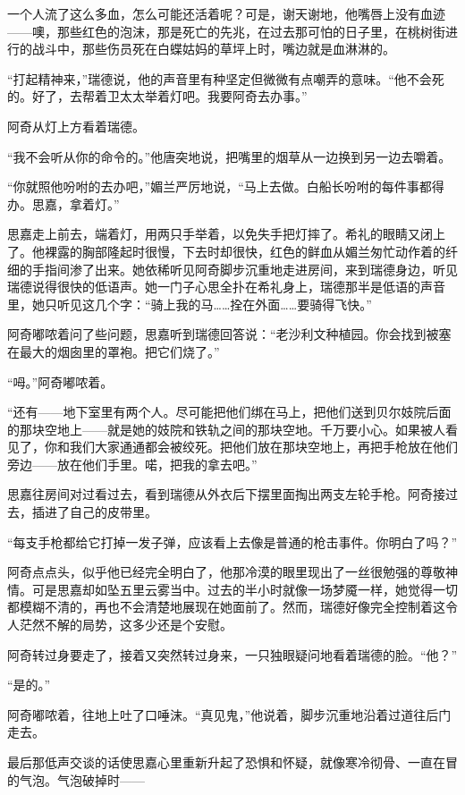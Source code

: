 \par 一个人流了这么多血，怎么可能还活着呢？可是，谢天谢地，他嘴唇上没有血迹——噢，那些红色的泡沫，那是死亡的先兆，在过去那可怕的日子里，在桃树街进行的战斗中，那些伤员死在白蝶姑妈的草坪上时，嘴边就是血淋淋的。
\par “打起精神来，”瑞德说，他的声音里有种坚定但微微有点嘲弄的意味。“他不会死的。好了，去帮着卫太太举着灯吧。我要阿奇去办事。”
\par 阿奇从灯上方看着瑞德。
\par “我不会听从你的命令的。”他唐突地说，把嘴里的烟草从一边换到另一边去嚼着。
\par “你就照他吩咐的去办吧，”媚兰严厉地说，“马上去做。白船长吩咐的每件事都得办。思嘉，拿着灯。”
\par 思嘉走上前去，端着灯，用两只手举着，以免失手把灯摔了。希礼的眼睛又闭上了。他裸露的胸部隆起时很慢，下去时却很快，红色的鲜血从媚兰匆忙动作着的纤细的手指间渗了出来。她依稀听见阿奇脚步沉重地走进房间，来到瑞德身边，听见瑞德说得很快的低语声。她一门子心思全扑在希礼身上，瑞德那半是低语的声音里，她只听见这几个字：“骑上我的马……拴在外面……要骑得飞快。”
\par 阿奇嘟哝着问了些问题，思嘉听到瑞德回答说：“老沙利文种植园。你会找到被塞在最大的烟囱里的罩袍。把它们烧了。”
\par “呣。”阿奇嘟哝着。
\par “还有——地下室里有两个人。尽可能把他们绑在马上，把他们送到贝尔妓院后面的那块空地上——就是她的妓院和铁轨之间的那块空地。千万要小心。如果被人看见了，你和我们大家通通都会被绞死。把他们放在那块空地上，再把手枪放在他们旁边——放在他们手里。喏，把我的拿去吧。”
\par 思嘉往房间对过看过去，看到瑞德从外衣后下摆里面掏出两支左轮手枪。阿奇接过去，插进了自己的皮带里。
\par “每支手枪都给它打掉一发子弹，应该看上去像是普通的枪击事件。你明白了吗？”
\par 阿奇点点头，似乎他已经完全明白了，他那冷漠的眼里现出了一丝很勉强的尊敬神情。可是思嘉却如坠五里云雾当中。过去的半小时就像一场梦魇一样，她觉得一切都模糊不清的，再也不会清楚地展现在她面前了。然而，瑞德好像完全控制着这令人茫然不解的局势，这多少还是个安慰。
\par 阿奇转过身要走了，接着又突然转过身来，一只独眼疑问地看着瑞德的脸。“他？”
\par “是的。”
\par 阿奇嘟哝着，往地上吐了口唾沫。“真见鬼，”他说着，脚步沉重地沿着过道往后门走去。
\par 最后那低声交谈的话使思嘉心里重新升起了恐惧和怀疑，就像寒冷彻骨、一直在冒的气泡。气泡破掉时——
